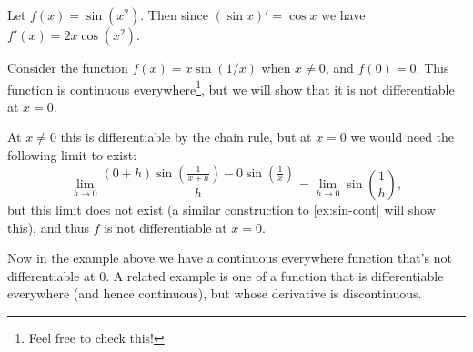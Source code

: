 \begin{example}
	Let $f(x) = \sin(x^2)$. Then since $(\sin x)' = \cos x$ we have $f'(x) = 2x \cos (x^2)$.
\end{example}
\begin{example}
	Consider the function $f(x) = x \sin(1/x)$ when $x \neq 0$, and $f(0) = 0$. This function is continuous everywhere\footnote{Feel free to check this!}, but we will show that it is not differentiable at $x = 0$.

	At $x \neq 0$ this is differentiable by the chain rule, but at $x = 0$ we would need the following limit to exist:
	$$
	\lim_{h \to 0} \frac{(0 + h)\sin\left(\frac{1}{x + h}\right) - 0\sin\left(\frac{1}{x}\right)}{h} = \lim_{h \to 0} \sin\left(\frac{1}{h}\right),
	$$
	but this limit does not exist (a similar construction to \autoref{ex:sin-cont} will show this), and thus $f$ is not differentiable at $x = 0$.
\end{example}

Now in the example above we have a continuous everywhere function that's not differentiable at $0$. A related example is one of a function that is differentiable everywhere (and hence continuous), but whose derivative is discontinuous.

